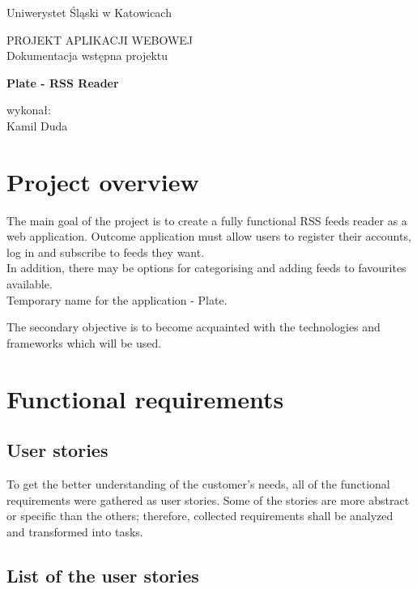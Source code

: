 \documentclass[]{article}
\begin{document}
\thispagestyle{empty}
\begin{center}
	\huge
	Uniwerystet Śląski w Katowicach
	
	\vspace{5cm}
		
	\Large
	PROJEKT APLIKACJI WEBOWEJ\\	
	Dokumentacja wstępna projektu
		
	\vspace{1cm}
	
	\textbf{Plate - RSS Reader}
	
	\vspace{10cm}
	
	\large
	wykonał:\\
	Kamil Duda
\end{center}


\newpage
\tableofcontents


\newpage
\section{Project overview}
\hspace{0.9cm}
The main goal of the project is to create a fully functional RSS feeds reader as a web application.
Outcome application must allow users to register their accounts, log in and subscribe to feeds they want.
\\In addition, there may be options for categorising and adding feeds to favourites available.\\
Temporary name for the application - Plate.

The secondary objective is to become acquainted with the technologies and frameworks which will be used.


\section{Functional requirements}
\subsection{User stories}
\hspace{0.9cm}
To get the better understanding of the customer's needs, all of the functional requirements were gathered as user stories.
Some of the stories are more abstract or specific than the others; therefore, collected requirements shall be analyzed and transformed into tasks.


\subsection{List of the user stories}
\end{document}
